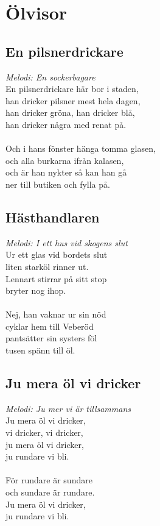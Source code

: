 \chapter{Ölvisor}
\section{En pilsnerdrickare}
\textit{Melodi: En sockerbagare}
\vspace{2mm}\\
En pilsnerdrickare här bor i staden,\\
han dricker pilsner mest hela dagen,\\
han dricker gröna, han dricker blå,\\
han dricker några med renat på.\\
\\
Och i hans fönster hänga tomma glasen,\\
och alla burkarna ifrån kalasen,\\
och är han nykter så kan han gå\\
ner till butiken och fylla på.

\newpage
\section{Hästhandlaren}
\textit{Melodi: I ett hus vid skogens slut}
\vspace{2mm}\\
Ur ett glas vid bordets slut\\
liten starköl rinner ut.\\
Lennart stirrar på sitt stop\\
bryter nog ihop.\\
\\
Nej, han vaknar ur sin nöd\\
cyklar hem till Veberöd\\
pantsätter sin systers föl\\
tusen spänn till öl.

\section{Ju mera öl vi dricker}
\textit{Melodi: Ju mer vi är tillsammans}
\vspace{2mm}\\
Ju mera öl vi dricker,\\
vi dricker, vi dricker,\\
ju mera öl vi dricker,\\
ju rundare vi bli.\\
\\
För rundare är sundare\\
och sundare är rundare.\\
Ju mera öl vi dricker,\\
ju rundare vi bli.

